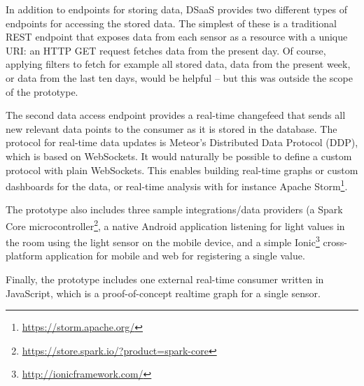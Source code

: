 In addition to endpoints for storing data, DSaaS provides two different types of endpoints for accessing the stored data. The simplest of these is a traditional REST endpoint that exposes data from each sensor as a resource with a unique URI: an HTTP GET request fetches data from the present day. Of course, applying filters to fetch for example all stored data, data from the present week, or data from the last ten days, would be helpful -- but this was outside the scope of the prototype.

The second data access endpoint provides a real-time changefeed that sends all new relevant data points to the consumer as it is stored in the database. The protocol for real-time data updates is Meteor's Distributed Data Protocol (DDP), which is based on WebSockets. It would naturally be possible to define a custom protocol with plain WebSockets. This enables building real-time graphs or custom dashboards for the data, or real-time analysis with for instance Apache Storm\footnote{\url{https://storm.apache.org/}}.

The prototype also includes three sample integrations/data providers (a Spark Core microcontroller\footnote{\url{https://store.spark.io/?product=spark-core}}, a native Android application listening for light values in the room using the light sensor on the mobile device, and a simple Ionic\footnote{\url{http://ionicframework.com/}} cross-platform application for mobile and web for registering a single value.

Finally, the prototype includes one external real-time consumer written in JavaScript, which is a proof-of-concept realtime graph for a single sensor. 
